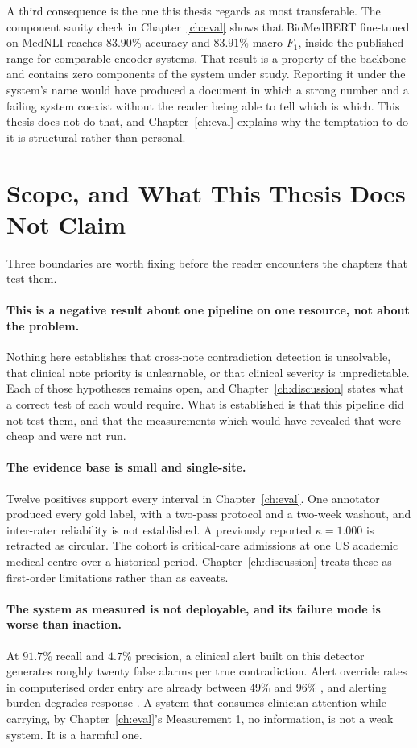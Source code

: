 A third consequence is the one this thesis regards as most transferable. The
component sanity check in Chapter~\ref{ch:eval} shows that BioMedBERT
fine-tuned on MedNLI reaches $83.90\%$ accuracy and $83.91\%$ macro $F_1$,
inside the published range for comparable encoder systems. That result is a
property of the backbone and contains zero components of the system under
study. Reporting it under the system's name would have produced a document in
which a strong number and a failing system coexist without the reader being
able to tell which is which. This thesis does not do that, and
Chapter~\ref{ch:eval} explains why the temptation to do it is structural rather
than personal.

\section{Scope, and What This Thesis Does Not Claim}
\label{sec:intro-scope}

Three boundaries are worth fixing before the reader encounters the chapters that
test them.

\paragraph{This is a negative result about one pipeline on one resource, not
about the problem.} Nothing here establishes that cross-note contradiction
detection is unsolvable, that clinical note priority is unlearnable, or that
clinical severity is unpredictable. Each of those hypotheses remains open, and
Chapter~\ref{ch:discussion} states what a correct test of each would require.
What is established is that this pipeline did not test them, and that the
measurements which would have revealed that were cheap and were not run.

\paragraph{The evidence base is small and single-site.} Twelve positives
support every interval in Chapter~\ref{ch:eval}. One annotator produced every
gold label, with a two-pass protocol and a two-week washout, and inter-rater
reliability is not established. A previously reported $\kappa = 1.000$ is
retracted as circular. The cohort is critical-care admissions at one US academic
medical centre over a historical period. Chapter~\ref{ch:discussion} treats
these as first-order limitations rather than as caveats.

\paragraph{The system as measured is not deployable, and its failure mode is
worse than inaction.} At $91.7\%$ recall and $4.7\%$ precision, a clinical
alert built on this detector generates roughly twenty false alarms per true
contradiction. Alert override rates in computerised order entry are already
between $49\%$ and $96\%$ \citep{vandersijs2006overriding}, and alerting burden
degrades response \citep{ancker2017alertfatigue}. A system that consumes
clinician attention while carrying, by Chapter~\ref{ch:eval}'s Measurement 1,
no information, is not a weak system. It is a harmful one.

